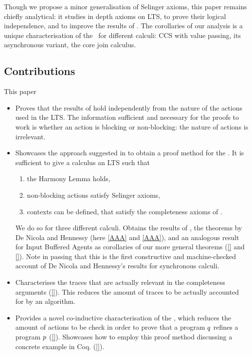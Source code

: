 Though we propose a minor generalisation of Selinger axioms, 
this paper remains chiefly analytical: it studies in depth axioms
on LTS, to prove their logical independence, and to improve
the results of \cite{bernardi2025}.
The corollaries of our analysis is a unique characterisation
of the \mustpreorder\ for different calculi:
CCS with value passing, %
its asynchronous variant, %
the core join calculus. %


\subsection*{Contributions} 
This paper
\begin{itemize}
  
\item Proves that the results of \cite{bernardi2025} hold independently
  from the nature of the actions used in the LTS.
  The information sufficient and necessary for the proofs
  to work is whether an action is blocking or non-blocking:
  the nature of actions is irrelevant.

  \item %
  Showcases the approach suggested in \cite{bernardi2025}
  to obtain a proof method for the \mustpreorder.
  It is sufficient to give a calculus an LTS such that
  \begin{enumerate}
    \item the Harmony Lemma holds,
    \item non-blocking actions satisfy Selinger axioms,
    \item contexts can be defined, that satisfy the completeness
      axioms of \cite{bernardi2025}.
  \end{enumerate}
  We do so for three different calculi.
  Obtains the results of \cite{}, the theorems by De Nicola and
  Hennessy (here \ref{AAA} and \ref{AAA}), and an analogous result for
  Input Buffered Agents as corollaries of our more general theorems
  (\ref{} and \ref{}).
  Note in passing that this is the first constructive and machine-checked
  account of De Nicola and Hennessy's results for synchronous calculi.
  
 \item %
  Characterises the traces that are
  actually relevant in the
  completeness arguments (\ref{}).
  This reduces the amount of traces to be actually
  accounted for by an algorithm.

\item %
  Provides a novel co-inductive characterisation of
  the \mustpreorder, which reduces the amount of actions
  to be check in order to prove that a program $q$ refines
  a program $p$ (\ref{}).
  Showcases how to employ this proof method discussing a concrete
  example in Coq. (\ref{}).
\end{itemize}
